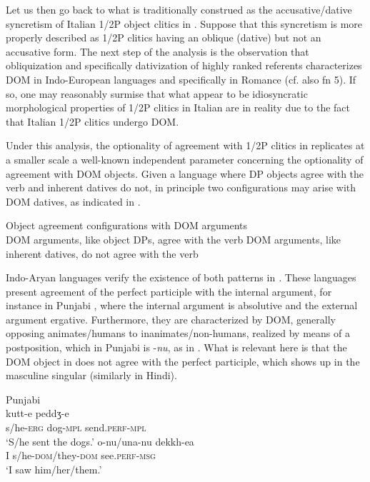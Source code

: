 \documentclass[output=paper,colorlinks,citecolor=brown,nonflat]{./langscibook}
\begin{document}
Let us then go back to what is traditionally construed as the accusative/dative syncretism of Italian 1/2P object clitics in .  Suppose that this syncretism is more properly described as 1/2P clitics having an oblique (dative) but not an accusative form. The next step of the analysis is the observation that obliquization and specifically dativization of highly ranked referents characterizes DOM in Indo-European languages and specifically in Romance (cf. also fn 5).  If so, one may reasonably surmise that what appear to be idiosyncratic morphological properties of 1/2P clitics in Italian are in reality due to the fact that Italian 1/2P clitics undergo DOM. 

Under this analysis, the optionality of agreement with 1/2P clitics in  replicates at a smaller scale a well-known independent parameter concerning the optionality of agreement with DOM objects. Given a language where DP objects agree with the verb and inherent datives do not, in principle two configurations may arise with DOM datives, as indicated in .

\ea%
    \label{ex:manzini:17}
    Object agreement configurations with DOM arguments \\
    \ea\label{ex:manzini:17a} 
    DOM arguments, like object DPs, agree with the verb
    \ex\label{ex:manzini:17b} 
    DOM arguments, like inherent datives, do not agree with the verb
    \z
\z

Indo-Aryan languages verify the existence of both patterns in \emph{.} These languages present agreement of the perfect participle with the internal argument, for instance in Punjabi , where the internal argument is absolutive and the external argument ergative. Furthermore, they are characterized by DOM, generally opposing animates/humans to inanimates/non-humans, realized by means of a postposition, which in Punjabi is -\textit{nu}, as in . What is relevant here is that the DOM object in  does not agree with the perfect participle, which shows up in the masculine singular (similarly in Hindi).

\ea%
    \label{ex:manzini:18}
    Punjabi \citep{ManziniSavoiaFranco2015}\\
    \ea\label{ex:manzini:18a} 
         {kutt-e}     {peddʒ-e}\\
        s/he-\textsc{erg}   dog-\textsc{mpl}   send.\textsc{perf-mpl}\\
    \glt ‘S/he sent the dogs.’  
    \ex\label{ex:manzini:18b} 
       {o-nu/una-nu}       {dekkh-ea}\\
        I   s/he\textsc{{}-dom}/they\textsc{{}-dom}    see.\textsc{perf-msg}\\
    \glt ‘I saw him/her/them.’
    \z 
\z 
\end{document}
